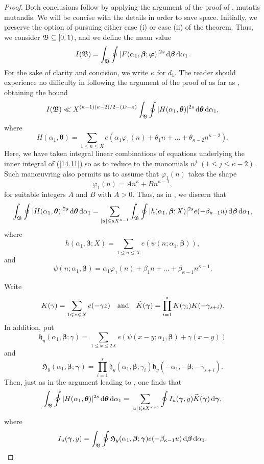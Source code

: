 \documentclass[12pt,reqno]{amsart}
\theoremstyle{definition}
\theoremstyle{remark}
\numberwithin{equation}{section}
\def\grh{{\mathfrak h}}\def\grH{{\mathfrak H}}
\def\alp{{\alpha}} \def\bfalp{{\boldsymbol \alpha}}
\def\bet{{\beta}}  \def\bfbet{{\boldsymbol \beta}}
\def\gam{{\gamma}} \def\Gam{{\Gamma}}
\def\bfgam{{\boldsymbol \gam}}
\def\tet{{\theta}} \def\bftet{{\boldsymbol \theta}}
\def\kap{{\kappa}}
\def\le{\leqslant} \def\ge{\geqslant} \def\pleq{\preccurlyeq} \def\ple{\prec}
\def\d{{\,{\rm d}}}
\begin{document}
\begin{proof} Both conclusions follow by applying the argument of the proof of 
\cite[Theorem 2.1]{Woo2012b}, mutatis mutandis. We will be concise with the details in 
order to save space. Initially, we preserve the option of pursuing either case (i) or case (ii) 
of the theorem. Thus, we consider ${\mathfrak B}\subseteq [0,1)$, and we define the mean value
\begin{equation}\label{14.10}
I(\grB)=\int_\grB \oint |F(\alp_1,\bfbet;\bfvarphi)|^{2s}\d\bfbet \d\alp_1.
\end{equation}
For the sake of clarity and concision, we write $\kap$ for $d_1$. The reader should 
experience no difficulty in following the argument of the proof of 
\cite[Theorem 2.1]{Woo2012b} as far as \cite[equation (12)]{Woo2012b}, obtaining the 
bound
\begin{equation}\label{14.11}
I(\grB)\ll X^{(\kap-1)(\kap-2)/2-(D-\kap)}\int_\grB\oint |H(\alp_1,\bftet)|^{2s}
\d\bftet\d\alp_1,
\end{equation}
where
$$H(\alp_1,\bftet)=\sum_{1\le n\le X}e(\alp_1\varphi_1(n)+\tet_1n+\ldots +
\tet_{\kap-2}n^{\kap-2}).$$
Here, we have taken integral linear combinations of equations underlying the inner integral 
of (\ref{14.11}) so as to reduce to the monomials $n^j$ $(1\le j\le \kap-2)$. Such 
man\oe uvring also permits us to assume that $\varphi_1(n)$ takes the shape
$$\varphi_1(n)=An^\kap+Bn^{\kap-1},$$
for suitable integers $A$ and $B$ with $A>0$. Thus, as in \cite[equation (13)]{Woo2012b}, 
we discern that
$$\int_\grB \oint |H(\alp_1,\bftet)|^{2s}\d\bftet \d\alp_1=\sum_{|u|\le sX^{\kap-1}}
\int_\grB \oint |h(\alp_1,\bfbet;X)|^{2s}e(-\bet_{\kap-1}u)\d\bfbet \d\alp_1,$$
where
$$h(\alp_1,\bfbet;X)=\sum_{1\le n\le X}e(\psi(n;\alp_1,\bfbet)),$$
and
$$\psi(n;\alp_1,\bfbet)=\alp_1\varphi_1(n)+\bet_1n+\ldots +\bet_{\kap-1}n^{\kap-1}.$$

\par Write
$$K(\gam)=\sum_{1\le z\le X}e(-\gam z)\quad \text{and}\quad \Ktil(\bfgam)=
\prod_{i=1}^sK(\gam_i)K(-\gam_{s+i}).$$
In addition, put
$$\grh_y(\alp_1,\bfbet;\gam)=\sum_{1\le x\le 2X}e(\psi(x-y;\alp_1,\bfbet)+\gam(x-y))$$
and
\begin{equation}\label{14.12}
\grH_y(\alp_1,\bfbet;\bfgam)=\prod_{i=1}^s \grh_y(\alp_1,\bfbet;\gam_i)\grh_y(-\alp_1,
-\bfbet;-\gam_{s+i}).
\end{equation}
Then, just as in the argument leading to \cite[equation (18)]{Woo2012b}, one finds that
\begin{equation}\label{14.13}
\int_\grB \oint |H(\alp_1,\bftet)|^{2s}\d\bftet \d\alp_1 =\sum_{|u|\le sX^{\kap-1}}
\oint I_u(\bfgam,y)\Ktil(\bfgam)\d\bfgam ,
\end{equation}
where
$$I_u(\bfgam,y)=\int_\grB \oint \grH_y(\alp_1,\bfbet;\bfgam)e(-\bet_{\kap-1}u)\d\bfbet 
\d\alp_1.$$


\end{proof}
\end{document}
